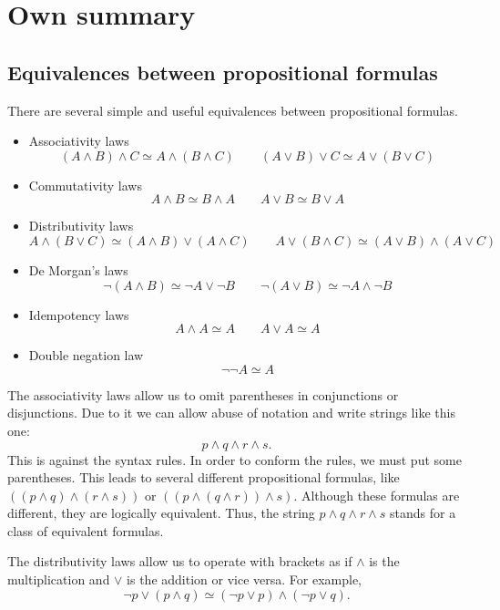 \section{Own summary}


\subsection{Equivalences between propositional formulas}

There are several simple and useful equivalences between propositional formulas.
\begin{itemize}
\item
Associativity laws
\[
(A \wedge B) \wedge C \simeq A \wedge (B \wedge C) \qquad (A \vee B) \vee C \simeq A \vee (B \vee C)
\]
\item
Commutativity laws
\[
A \wedge B \simeq B \wedge A \qquad A \vee B \simeq B \vee A
\]
\item
Distributivity laws
\[
A \wedge (B \vee C) \simeq (A \wedge B) \vee (A \wedge C) \qquad A \vee (B \wedge C) \simeq (A \vee B) \wedge (A \vee C)
\]
\item
De Morgan's laws
\[
\neg(A \wedge B) \simeq \neg A \vee \neg B \qquad \neg(A \vee B) \simeq \neg A \wedge \neg B
\]
\item
Idempotency laws
\[
A \wedge A \simeq A \qquad A \vee A \simeq A
\]
\item
Double negation law
\[
\neg\neg A \simeq A
\]
\end{itemize}

The associativity laws allow us to omit parentheses in conjunctions or disjunctions.
Due to it we can allow abuse of notation and write strings like this one:
\[
p \wedge q \wedge r \wedge s.
\]
This is against the syntax rules.
In order to conform the rules, we must put some parentheses.
This leads to several different propositional formulas, like $((p \wedge q) \wedge (r \wedge s))$ or $((p \wedge (q \wedge r)) \wedge s)$.
Although these formulas are different, they are logically equivalent.
Thus, the string $p \wedge q \wedge r \wedge s$ stands for a class of equivalent formulas.

The distributivity laws allow us to operate with brackets as if $\wedge$ is the multiplication and $\vee$ is the addition
or vice versa.
For example,
\[
\neg p \vee (p \wedge q) \simeq (\neg p \vee p) \wedge (\neg p \vee q).
\]

